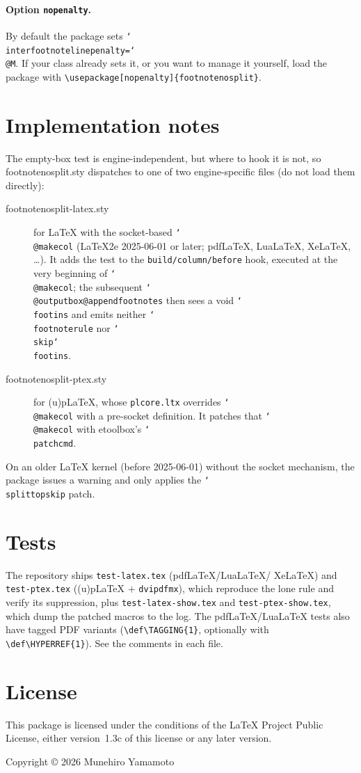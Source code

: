 \documentclass{article}
\newcommand*\cs[1]{\texttt{\char`\\#1}}
\newcommand*\pkg[1]{\textsf{#1}}
\begin{document}
\paragraph{Option \texttt{nopenalty}.}
By default the package sets
\cs{interfootnotelinepenalty}\texttt{=}\cs{@M}.  If your class already
sets it, or you want to manage it yourself, load the package with
\verb|\usepackage[nopenalty]{footnotenosplit}|.

\section{Implementation notes}

The empty-box test is engine-independent, but where to hook it is not,
so \pkg{footnotenosplit.sty} dispatches to one of two engine-specific
files (do not load them directly):

\begin{description}
\item[\pkg{footnotenosplit-latex.sty}] for \LaTeX{} with the
  socket-based \cs{@makecol} (\LaTeX2e 2025-06-01 or later; pdf\LaTeX,
  Lua\LaTeX, Xe\LaTeX, \dots).  It adds the test to the
  \texttt{build/column/before} hook, executed at the very beginning of
  \cs{@makecol}; the subsequent \cs{@outputbox@appendfootnotes} then
  sees a void \cs{footins} and emits neither \cs{footnoterule} nor
  \cs{skip}\cs{footins}.
\item[\pkg{footnotenosplit-ptex.sty}] for (u)p\LaTeX, whose
  \texttt{plcore.ltx} overrides \cs{@makecol} with a pre-socket
  definition.  It patches that \cs{@makecol} with
  \pkg{etoolbox}'s \cs{patchcmd}.
\end{description}

On an older \LaTeX{} kernel (before 2025-06-01) without the socket
mechanism, the package issues a warning and only applies the
\cs{splittopskip} patch.

\section{Tests}

The repository ships \texttt{test-latex.tex} (pdf\LaTeX/Lua\LaTeX/%
Xe\LaTeX) and \texttt{test-ptex.tex} ((u)p\LaTeX{} $+$
\texttt{dvipdfmx}), which reproduce the lone rule and verify its
suppression, plus \texttt{test-latex-show.tex} and
\texttt{test-ptex-show.tex}, which dump the patched macros to the log.
The pdf\LaTeX/Lua\LaTeX{} tests also have tagged PDF variants
(\verb|\def\TAGGING{1}|, optionally with \verb|\def\HYPERREF{1}|).
See the comments in each file.

\section{License}

This package is licensed under the conditions of the \LaTeX{} Project
Public License, either version~1.3c of this license or any later
version.

\medskip
\noindent
Copyright \copyright{} 2026 Munehiro Yamamoto
\end{document}
